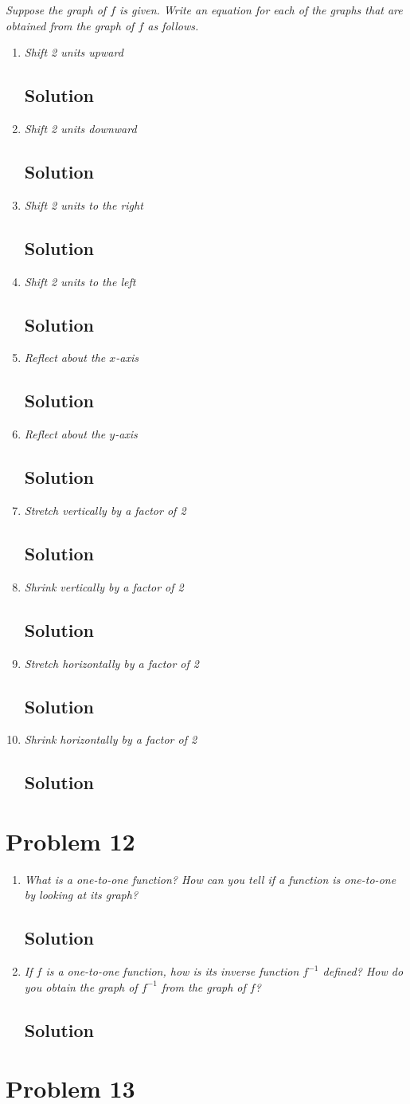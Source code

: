 \documentclass[11pt]{article}
\newcommand{\soln}{\subsection*}
\newcommand{\qn}{\textit}
\begin{document}
\qn{Suppose the graph of $f$ is given. Write an equation for each of the graphs that are obtained from the graph of $f$ as follows.}
\begin{enumerate}
	\item \qn{Shift 2 units upward}
	\soln{Solution}
	
	\item \qn{Shift 2 units downward}
	\soln{Solution}
	
	\item \qn{Shift 2 units to the right}
	\soln{Solution}
	
	\item \qn{Shift 2 units to the left}
	\soln{Solution}
	
	\item \qn{Reflect about the $x$-axis}
	\soln{Solution}
	
	\item \qn{Reflect about the $y$-axis}
	\soln{Solution}
	
	\item \qn{Stretch vertically by a factor of 2}
	\soln{Solution}
	
	\item \qn{Shrink vertically by a factor of 2}
	\soln{Solution}
	
	\item \qn{Stretch horizontally by a factor of 2}
	\soln{Solution}
	
	\item \qn{Shrink horizontally by a factor of 2}
	\soln{Solution}
\end{enumerate}

\section*{Problem 12}

\begin{enumerate}
	\item \qn{What is a one-to-one function? How can you tell if a function is one-to-one by looking at its graph?}
	\soln{Solution}
	
	\item \qn{If $f$ is a one-to-one function, how is its inverse function $f^{-1}$ defined? How do you obtain the graph of $f^{-1}$ from the graph of $f$?}
	\soln{Solution}
\end{enumerate}

\section*{Problem 13}
\end{document}
